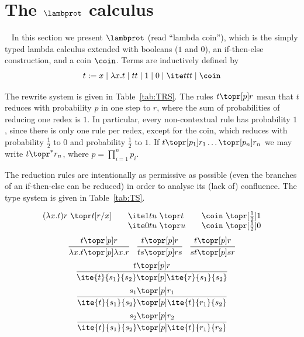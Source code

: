 \section{The \texorpdfstring{$\lambprot$}{lambda coin} calculus}~\label{sec:calculus}
In this section we present 
$\lambprot$ (read ``lambda coin''), which is the
simply typed lambda calculus extended with booleans ($1$ and $0$), an if-then-else construction, and a coin $\coin$.
%
Terms are inductively defined by 
\[
  t := x\mid \lambda x.t \mid tt \mid 1\mid 0\mid \ite ttt\mid \coin
\]

The rewrite system is given in Table~\ref{tab:TRS}. The rules $t\topr[p]r$ mean that $t$ reduces with probability $p$ in one step to $r$, where the sum of probabilities of reducing one redex is $1$. In particular, every non-contextual rule has probability $1$, since there is only one rule per redex, except for the coin, which reduces with probability $\frac 12$ to $0$ and probability $\frac 12$ to $1$. If $t\topr[p_1]r_1\dots\topr[p_n]r_n$ we may write $t\topr^*r_n$, where $p=\prod_{i=1}^np_i$.

The reduction rules are intentionally as permissive as possible (even the branches of an if-then-else can be reduced) in order to analyse its (lack of) confluence. The type system is given in Table~\ref{tab:TS}.

\begin{table}[t]
  \[
    \begin{array}{r@{\ }l@{\qquad}r@{\ }l@{\qquad}r@{\ }l}
      (\lambda x.t)r &\topr t[r/x]
      &
      \ite 1tu &\topr t
      &
      \coin &\topr[{\frac 12}] 1
      \\
      &&
      \ite 0tu &\topr u
      &
      \coin &\topr[{\frac 12}] 0
    \end{array}
  \]
  \smallskip
  \[
  \begin{array}{c c c}
    \infer{\lambda x.t\topr[p]\lambda x.r}{t\topr[p] r} & \infer{ts\topr[p] rs}{t\topr[p] r} & \infer{st\topr[p] sr}{t\topr[p] r}\\[5pt]
    \multicolumn{3}{c}{\infer{\ite{t}{s_1}{s_2}\topr[p]\ite{r}{s_1}{s_2}}{t\topr[p] r}}\\[5pt]
    \multicolumn{3}{c}{\infer{\ite{t}{s_1}{s_2}\topr[p]\ite{t}{r_1}{s_2}}{s_1\topr[p] r_1}}\\[5pt]
    \multicolumn{3}{c}{\infer{\ite{t}{s_1}{s_2}\topr[p]\ite{t}{r_1}{r_2}}{s_2\topr[p] r_2}}
  \end{array}
  \]
  \caption{Rewrite system for $\lambprot$.}
  \label{tab:TRS}
\end{table}

